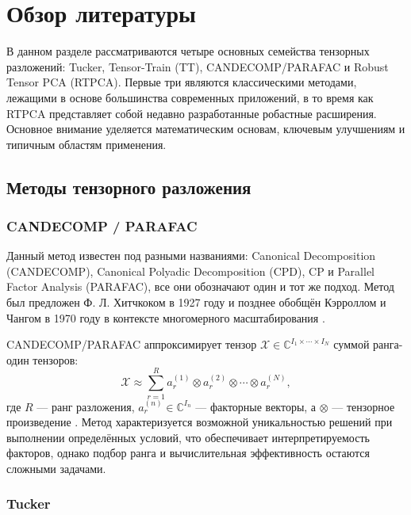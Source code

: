 \chapter{Обзор литературы}
\label{chap:lr}

В данном разделе рассматриваются четыре основных семейства тензорных разложений: Tucker, Tensor-Train (TT), CANDECOMP/PARAFAC и Robust Tensor PCA (RTPCA). Первые три являются классическими методами, лежащими в основе большинства современных приложений, в то время как RTPCA представляет собой недавно разработанные робастные расширения. Основное внимание уделяется математическим основам, ключевым улучшениям и типичным областям применения.

\section{Методы тензорного разложения}
\label{sec:lr_decomposition_methods}

\subsection*{CANDECOMP / PARAFAC}
\label{subsec:lr_cp}

Данный метод известен под разными названиями: Canonical Decomposition (CANDECOMP), Canonical Polyadic Decomposition (CPD), CP и Parallel Factor Analysis (PARAFAC), все они обозначают один и тот же подход. Метод был предложен Ф. Л. Хитчкоком в 1927 году \cite{Hitchcock1927} и позднее обобщён Кэрроллом и Чангом в 1970 году в контексте многомерного масштабирования \cite{Carroll1970}. 

CANDECOMP/PARAFAC аппроксимирует тензор \(\mathcal{X} \in \mathbb{C}^{I_1 \times \cdots \times I_N}\) суммой ранга-один тензоров:
\[
\mathcal{X} \approx \sum_{r=1}^R a_r^{(1)} \otimes a_r^{(2)} \otimes \cdots \otimes a_r^{(N)},
\]
где \(R\) — ранг разложения, \(a_r^{(n)} \in \mathbb{C}^{I_n}\) — факторные векторы, а \(\otimes\) — тензорное произведение \cite{tensorly_parafac_tucker, tensorly_parafac_2, tensorly_parafac_3}. Метод характеризуется возможной уникальностью решений при выполнении определённых условий, что обеспечивает интерпретируемость факторов, однако подбор ранга и вычислительная эффективность остаются сложными задачами.

\subsection*{Tucker}
\label{subsec:lr_tucker}

